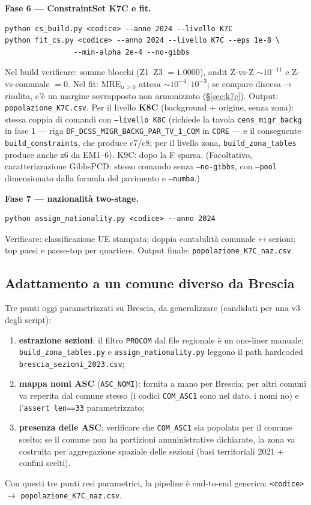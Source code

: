 \documentclass[11pt,a4paper]{article}
\newcommand{\code}[1]{\texttt{#1}}
\begin{document}
\medskip\noindent\textbf{Fase 6 --- ConstraintSet K7C e fit.}
\begin{lstlisting}
python cs_build.py <codice> --anno 2024 --livello K7C
python fit_cs.py <codice> --anno 2024 --livello K7C --eps 1e-8 \
                --min-alpha 2e-4 --no-gibbs
\end{lstlisting}
Nel build verificare: somme blocchi (Z1--Z3 $=1.0000$), audit Z-vs-Z
$\sim10^{-11}$ e Z-vs-comunale $=0$. Nel fit: MRE$_{\alpha>0}$ attesa
$\sim10^{-4}$--$10^{-3}$; se compare discesa$\to$risalita, c'\`e un margine
sovrapposto non armonizzato (\S\ref{sec:k7c}). Output:
\code{popolazione\_K7C.csv}. Per il livello \textbf{K8C} (background $+$
origine, senza zona): stessa coppia di comandi con \code{--livello K8C}
(richiede la tavola \code{cens\_migr\_backg} in fase 1 --- riga
\code{DF\_DCSS\_MIGR\_BACKG\_PAR\_TV\_1\_COM} in \code{CORE} --- e il
conseguente \code{build\_constraints}, che produce c7/c8; per il livello
zona, \code{build\_zona\_tables} produce anche z6 da EM1--6). K9C: dopo la
F sparsa.
(Facoltativo, caratterizzazione GibbsPCD: stesso comando senza
\code{--no-gibbs}, con \code{--pool} dimensionato dalla formula del
pavimento e \code{--numba}.)

\medskip\noindent\textbf{Fase 7 --- nazionalit\`a two-stage.}
\begin{lstlisting}
python assign_nationality.py <codice> --anno 2024
\end{lstlisting}
Verificare: classificazione UE stampata; doppia contabilit\`a
comunale$\leftrightarrow$sezioni; top paesi e paese-top per quartiere.
Output finale: \code{popolazione\_K7C\_naz.csv}.

\subsection{Adattamento a un comune diverso da Brescia}
\label{sec:adapt}
Tre punti oggi parametrizzati su Brescia, da generalizzare (candidati per una
v3 degli script):
\begin{enumerate}[leftmargin=*,itemsep=1pt]
  \item \textbf{estrazione sezioni}: il filtro \code{PROCOM} dal file
  regionale \`e un one-liner manuale; \code{build\_zona\_tables.py} e
  \code{assign\_nationality.py} leggono il path hardcoded
  \code{brescia\_sezioni\_2023.csv};
  \item \textbf{mappa nomi ASC} (\code{ASC\_NOMI}): fornita a mano per
  Brescia; per altri comuni va reperita dal comune stesso (i codici
  \code{COM\_ASC1} sono nel dato, i nomi no) e l'\code{assert len==33}
  parametrizzato;
  \item \textbf{presenza delle ASC}: verificare che \code{COM\_ASC1} sia
  popolata per il comune scelto; se il comune non ha partizioni
  amministrative dichiarate, la zona va costruita per aggregazione
  spaziale delle sezioni (basi territoriali 2021 + confini scelti).
\end{enumerate}
Con questi tre punti resi parametrici, la pipeline \`e end-to-end generica:
\code{<codice>} $\to$ \code{popolazione\_K7C\_naz.csv}.
\end{document}
